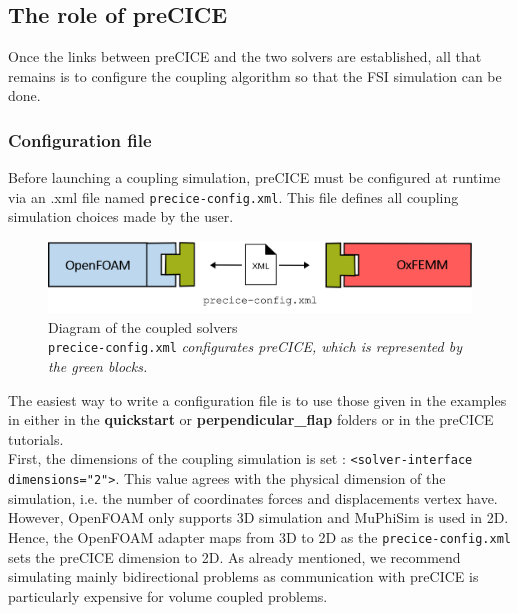 \documentclass[oneside,11pt,times]{book}
\begin{document}
\subsection{The role of preCICE}
Once the links between preCICE and the two solvers are established, all that remains is to configure the coupling algorithm so that the FSI simulation can be done.

\subsubsection{Configuration file}
Before launching a coupling simulation, preCICE must be configured at runtime via an .xml file named \texttt{precice-config.xml}. This file defines all coupling simulation choices made by the user.\\

\begin{figure}[H]
    \centering
    \includegraphics[width=14cm]{imgs/Illustrations/precice-config.png}
    \caption{Diagram of the coupled solvers\\ \texttt{precice-config.xml} \emph{configurates preCICE, which is represented by the green blocks.}}
    \label{configfile}
\end{figure}

The easiest way to write a configuration file is to use those given in the examples in either in the \textbf{quickstart} or \textbf{perpendicular\_flap} folders or in the preCICE tutorials.\\


First, the dimensions of the coupling simulation is set : \texttt{<solver-interface dimensions="2">}. This value agrees with the physical dimension of the simulation, i.e. the number of coordinates forces and displacements vertex have. However, OpenFOAM only supports 3D simulation and MuPhiSim is used in 2D. Hence, the OpenFOAM adapter maps from 3D to 2D as the \texttt{precice-config.xml} sets the preCICE dimension to 2D. As already mentioned, we recommend simulating mainly bidirectional problems as communication with preCICE is particularly expensive for volume coupled problems.\\
\end{document}
